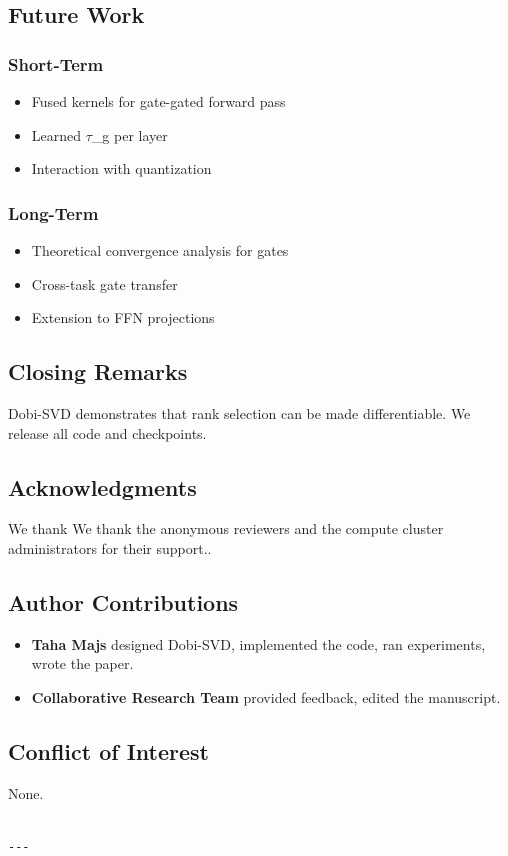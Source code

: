 \subsection{Future Work}

\subsubsection{Short-Term}
\begin{itemize}
\item Fused kernels for gate-gated forward pass
\item Learned $\tau$\_g per layer
\item Interaction with quantization

\end{itemize}
\subsubsection{Long-Term}
\begin{itemize}
\item Theoretical convergence analysis for gates
\item Cross-task gate transfer
\item Extension to FFN projections

\end{itemize}
\subsection{Closing Remarks}

Dobi-SVD demonstrates that rank selection can be made differentiable. We 
release all code and checkpoints.

\subsection{Acknowledgments}

We thank We thank the anonymous reviewers and the compute cluster administrators for their support..

\subsection{Author Contributions}

\begin{itemize}
\item \textbf{Taha Majs} designed Dobi-SVD, implemented the code, ran experiments,
  wrote the paper.
\item \textbf{Collaborative Research Team} provided feedback, edited the manuscript.

\end{itemize}
\subsection{Conflict of Interest}

None.
\begin{lstlisting}

---
\end{lstlisting}